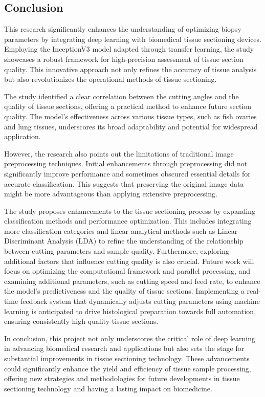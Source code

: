 \subsection{Conclusion}
This research significantly enhances the understanding of optimizing biopsy parameters by integrating deep learning with biomedical tissue sectioning devices. Employing the InceptionV3 model adapted through transfer learning, the study showcases a robust framework for high-precision assessment of tissue section quality. This innovative approach not only refines the accuracy of tissue analysis but also revolutionizes the operational methods of tissue sectioning.

The study identified a clear correlation between the cutting angles and the quality of tissue sections, offering a practical method to enhance future section quality. The model’s effectiveness across various tissue types, such as fish ovaries and lung tissues, underscores its broad adaptability and potential for widespread application.

However, the research also points out the limitations of traditional image preprocessing techniques. Initial enhancements through preprocessing did not significantly improve performance and sometimes obscured essential details for accurate classification. This suggests that preserving the original image data might be more advantageous than applying extensive preprocessing.

The study proposes enhancements to the tissue sectioning process by expanding classification methods and performance optimization. This includes integrating more classification categories and linear analytical methods such as Linear Discriminant Analysis (LDA) to refine the understanding of the relationship between cutting parameters and sample quality. Furthermore, exploring additional factors that influence cutting quality is also crucial. Future work will focus on optimizing the computational framework and parallel processing, and examining additional parameters, such as cutting speed and feed rate, to enhance the model's predictiveness and the quality of tissue sections. Implementing a real-time feedback system that dynamically adjusts cutting parameters using machine learning is anticipated to drive histological preparation towards full automation, ensuring consistently high-quality tissue sections.

In conclusion, this project not only underscores the critical role of deep learning in advancing biomedical research and applications but also sets the stage for substantial improvements in tissue sectioning technology. These advancements could significantly enhance the yield and efficiency of tissue sample processing, offering new strategies and methodologies for future developments in tissue sectioning technology and having a lasting impact on biomedicine.


\FloatBarrier %